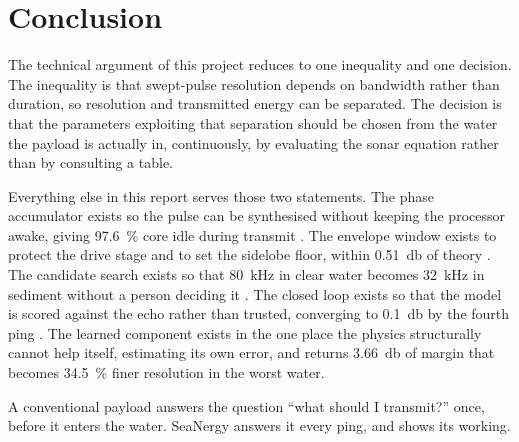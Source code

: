 \documentclass[11pt,a4paper]{article}
\begin{document}
\section{Conclusion}

The technical argument of this project reduces to one inequality and one
decision. The inequality is that swept-pulse resolution depends on bandwidth
rather than duration, so resolution and transmitted energy can be separated. The
decision is that the parameters exploiting that separation should be chosen from
the water the payload is actually in, continuously, by evaluating the sonar
equation rather than by consulting a table.

Everything else in this report serves those two statements. The phase
accumulator exists so the pulse can be synthesised without keeping the processor
awake, giving \SI{97.6}{\percent} core idle during transmit . The
envelope window exists to protect the drive stage and to set the sidelobe floor,
within \SI{0.51}{\decibel} of theory . The candidate search exists so
that \SI{80}{\kilo\hertz} in clear water becomes \SI{32}{\kilo\hertz} in
sediment without a person deciding it . The closed loop exists so that
the model is scored against the echo rather than trusted, converging to
\SI{0.1}{\decibel} by the fourth ping . The learned component exists
in the one place the physics structurally cannot help itself, estimating its own
error, and returns \SI{3.66}{\decibel} of margin that becomes
\SI{34.5}{\percent} finer resolution in the worst water.

A conventional payload answers the question ``what should I transmit?'' once,
before it enters the water. SeaNergy answers it every ping, and shows its
working.
\end{document}

